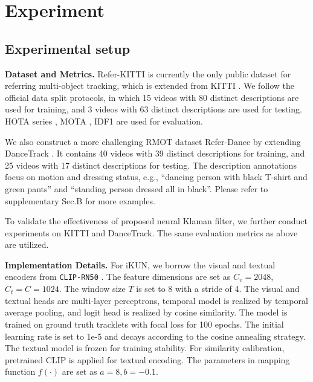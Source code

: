 \documentclass[10pt,twocolumn,letterpaper]{article}
\begin{document}
\section{Experiment}

\subsection{Experimental setup}
    \noindent\textbf{Dataset and Metrics.}
    Refer-KITTI \cite{wu2023referring} is currently the only public dataset for referring multi-object tracking,
    which is extended from KITTI \cite{geiger2012we}.
    We follow the official data split protocols, in which 15 videos with 80 distinct descriptions are used for training,
    and 3 videos with 63 distinct descriptions are used for testing.
    HOTA series \cite{luiten2021hota}, MOTA \cite{bernardin2008evaluating}, IDF1 \cite{ristani2016performance} are used for evaluation.

    We also construct a more challenging RMOT dataset Refer-Dance by extending DanceTrack \cite{sun2022dancetrack}.
    It contains 40 videos with 39 distinct descriptions for training, and 25 videos with 17 distinct descriptions for testing.
    The description annotations focus on motion and dressing status, 
    e.g., ``dancing person with black T-shirt and green pants'' and ``standing person dressed all in black''.
    Please refer to supplementary Sec.B for more examples.

    To validate the effectiveness of proposed neural Klaman filter, we further conduct experiments on KITTI and DanceTrack.
    The same evaluation metrics as above are utilized.

    \noindent\textbf{Implementation Details.}
    For iKUN, we borrow the visual and textual encoders from \texttt{CLIP-RN50} \cite{radford2021learning}.
    The feature dimensions are set as $C_v = 2048$, $C_t = C = 1024$.
    The window size $T$ is set to 8 with a stride of 4.
    The visual and textual heads are multi-layer perceptrons, temporal model is realized by temporal average pooling, and logit head is realized by cosine similarity.
    The model is trained on ground truth tracklets with focal loss \cite{lin2017focal} for 100 epochs.
    The initial learning rate is set to 1e-5 and decays according to the cosine annealing strategy.
    The textual model is frozen for training stability.
    For similarity calibration, pretrained CLIP is applied for textual encoding.
    The parameters in mapping function $f(\cdot)$ are set as $a=8, b=-0.1$.
    
\end{document}
